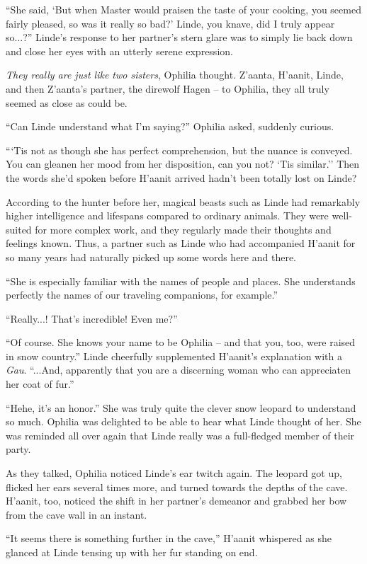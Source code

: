 ``She said, `But when Master would praisen the taste of your cooking, you seemed fairly pleased, so was it really so bad?' Linde, you knave, did I truly appear so...?'' Linde's response to her partner's stern glare was to simply lie back down and close her eyes with an utterly serene expression.

\emph{They really are just like two sisters}, Ophilia thought. Z'aanta, H'aanit, Linde, and then Z'aanta's partner, the direwolf H\:agen -- to Ophilia, they all truly seemed as close as could be.

``Can Linde understand what I'm saying?'' Ophilia asked, suddenly curious.

```Tis not as though she has perfect comprehension, but the nuance is conveyed. You can gleanen her mood from her disposition, can you not? `Tis similar.'' Then the words she'd spoken before H'aanit arrived hadn't been totally lost on Linde?

According to the hunter before her, magical beasts such as Linde had remarkably higher intelligence and lifespans compared to ordinary animals. They were well-suited for more complex work, and they regularly made their thoughts and feelings known. Thus, a partner such as Linde who had accompanied H'aanit for so many years had naturally picked up some words here and there.

``She is especially familiar with the names of people and places. She understands perfectly the names of our traveling companions, for example.''

``Really...! That's incredible! Even me?''

``Of course. She knows your name to be Ophilia -- and that you, too, were raised in snow country.'' Linde cheerfully supplemented H'aanit's explanation with a \emph{Gau}. ``...And, apparently that you are a discerning woman who can appreciaten her coat of fur.''

``Hehe, it's an honor.'' She was truly quite the clever snow leopard to understand so much. Ophilia was delighted to be able to hear what Linde thought of her. She was reminded all over again that Linde really was a full-fledged member of their party.

As they talked, Ophilia noticed Linde's ear twitch again. The leopard got up, flicked her ears several times more, and turned towards the depths of the cave. H'aanit, too, noticed the shift in her partner's demeanor and grabbed her bow from the cave wall in an instant.

``It seems there is something further in the cave,'' H'aanit whispered as she glanced at Linde tensing up with her fur standing on end.

